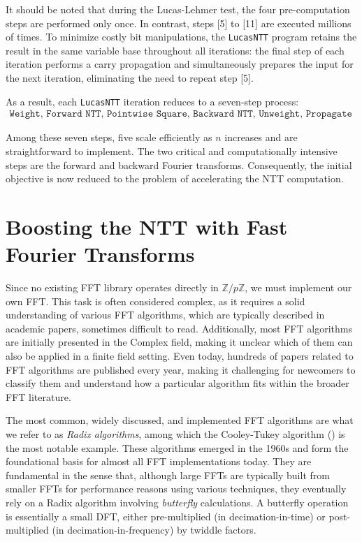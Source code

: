 \documentclass{article}
\begin{document}
It should be noted that during the Lucas-Lehmer test, the four pre-computation steps are performed only once. In contrast, steps [5] to [11] are executed millions of times. To minimize costly bit manipulations, the \texttt{LucasNTT} program retains the result in the same variable base throughout all iterations: the final step of each iteration performs a carry propagation and simultaneously prepares the input for the next iteration, eliminating the need to repeat step [5].

As a result, each \texttt{LucasNTT} iteration reduces to a seven-step process:
\begin{align*}
\label{eq:ll_loop}
\texttt{Weight, Forward NTT, Pointwise Square, Backward NTT, Unweight, Propagate carry, Minus 2}
\end{align*}

Among these seven steps, five scale efficiently as $n$ increases and are straightforward to implement. The two critical and computationally intensive steps are the forward and backward Fourier transforms. Consequently, the initial objective is now reduced to the problem of accelerating the NTT computation.

\section{Boosting the NTT with Fast Fourier Transforms}

Since no existing FFT library operates directly in $\mathbb{Z}/p\mathbb{Z}$, we must implement our own FFT. This task is often considered complex, as it requires a solid understanding of various FFT algorithms, which are typically described in academic papers, sometimes difficult to read. Additionally, most FFT algorithms are initially presented in the Complex field, making it unclear which of them can also be applied in a finite field setting. Even today, hundreds of papers related to FFT algorithms are published every year, making it challenging for newcomers to classify them and understand how a particular algorithm fits within the broader FFT literature.

The most common, widely discussed, and implemented FFT algorithms are what we refer to as \textit{Radix algorithms}, among which the Cooley-Tukey algorithm (\cite{CT65}) is the most notable example. These algorithms emerged in the 1960s and form the foundational basis for almost all FFT implementations today. They are fundamental in the sense that, although large FFTs are typically built from smaller FFTs for performance reasons using various techniques, they eventually rely on a Radix algorithm involving \emph{butterfly} calculations. A butterfly operation is essentially a small DFT, either pre-multiplied (in decimation-in-time) or post-multiplied (in decimation-in-frequency) by twiddle factors.
\end{document}
